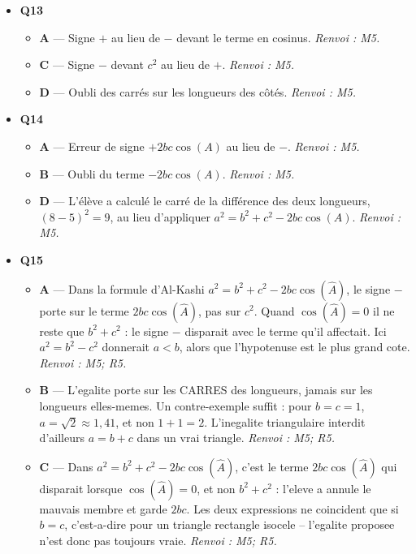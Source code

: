 \begin{itemize}
\begin{itemize}
    \item \textbf{C} — La hauteur est perpendiculaire à $(BC)$, pas à $(AC)$. \emph{Renvoi : M4.}
    \item \textbf{D} — Relation de longueurs non justifiée. \emph{Renvoi : M4.}
  \end{itemize}
  \item \textbf{Q13}
  \begin{itemize}
    \item \textbf{A} — Signe $+$ au lieu de $-$ devant le terme en cosinus. \emph{Renvoi : M5.}
    \item \textbf{C} — Signe $-$ devant $c^2$ au lieu de $+$. \emph{Renvoi : M5.}
    \item \textbf{D} — Oubli des carrés sur les longueurs des côtés. \emph{Renvoi : M5.}
  \end{itemize}
  \item \textbf{Q14}
  \begin{itemize}
    \item \textbf{A} — Erreur de signe $+2bc \cos(A)$ au lieu de $-$. \emph{Renvoi : M5.}
    \item \textbf{B} — Oubli du terme $-2bc \cos(A)$. \emph{Renvoi : M5.}
    \item \textbf{D} — L'élève a calculé le carré de la différence des deux longueurs, $(8-5)^2=9$, au lieu d'appliquer $a^2=b^2+c^2-2bc\cos(A)$. \emph{Renvoi : M5.}
  \end{itemize}
  \item \textbf{Q15}
  \begin{itemize}
    \item \textbf{A} — Dans la formule d'Al-Kashi $a^2 = b^2 + c^2 - 2bc\cos(\widehat{A})$, le signe $-$ porte sur le terme $2bc\cos(\widehat{A})$, pas sur $c^2$. Quand $\cos(\widehat{A}) = 0$ il ne reste que $b^2 + c^2$ : le signe $-$ disparait avec le terme qu'il affectait. Ici $a^2 = b^2 - c^2$ donnerait $a < b$, alors que l'hypotenuse est le plus grand cote. \emph{Renvoi : M5; R5.}
    \item \textbf{B} — L'egalite porte sur les CARRES des longueurs, jamais sur les longueurs elles-memes. Un contre-exemple suffit : pour $b = c = 1$, $a = \sqrt{2} \approx 1{,}41$, et non $1 + 1 = 2$. L'inegalite triangulaire interdit d'ailleurs $a = b + c$ dans un vrai triangle. \emph{Renvoi : M5; R5.}
    \item \textbf{C} — Dans $a^2 = b^2 + c^2 - 2bc\cos(\widehat{A})$, c'est le terme $2bc\cos(\widehat{A})$ qui disparait lorsque $\cos(\widehat{A}) = 0$, et non $b^2 + c^2$ : l'eleve a annule le mauvais membre et garde $2bc$. Les deux expressions ne coincident que si $b = c$, c'est-a-dire pour un triangle rectangle isocele -- l'egalite proposee n'est donc pas toujours vraie. \emph{Renvoi : M5; R5.}
  \end{itemize}
\end{itemize}
\fi
